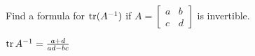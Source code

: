 
\begin{Exercise}[
name={},
title={}, 
difficulty=0,
origin={\cite{YL}}]
Find a formula for $\operatorname{tr}(A^{-1})$ if $A=\begin{bmatrix}a&b\\c&d\end{bmatrix}$ is invertible.
\end{Exercise}

\begin{Answer}
$\operatorname{tr}{A^{-1}}=\frac{a+d}{ad-bc}$
\end{Answer}
